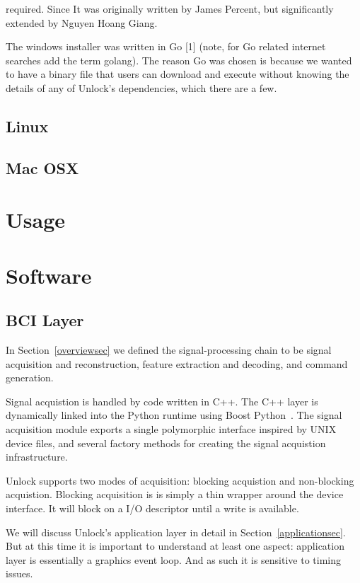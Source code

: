 \documentclass[11pt]{article}
\begin{document}
 required.  Since It was originally written
by James Percent, but significantly extended by Nguyen Hoang Giang.

The windows installer was written in Go [1] (note, for Go related internet searches add the term
golang).  The reason Go was chosen is because we wanted to have a binary file that users can
download and execute without knowing the details of any of Unlock's dependencies, which there are
a few.
\subsection{Linux}
\subsection{Mac OSX}

\section{Usage}

\section{Software}
\subsection{BCI Layer}\label{bcisec}

In Section~\ref{overviewsec} we defined the signal-processing chain to be signal acquisition and reconstruction, feature extraction and decoding, and command generation.

Signal acquistion is handled by code written in C++.  The C++ layer is dynamically linked into the Python runtime using Boost Python~\cite{boostpython}.  The signal acquisition module exports a single polymorphic interface inspired by UNIX device files, and several factory methods for creating the signal acquistion infrastructure.

Unlock supports two modes of acquisition: blocking acquistion and non-blocking acquistion.  Blocking acquisition is is simply a thin wrapper around the device interface.  It will block on a I/O descriptor until a write is available.

We will discuss Unlock's application layer in detail in Section~\ref{applicationsec}.  But at this time it is important to understand at least one aspect: application layer is essentially a graphics event loop.  And as such it is sensitive to timing issues.
\end{document}
